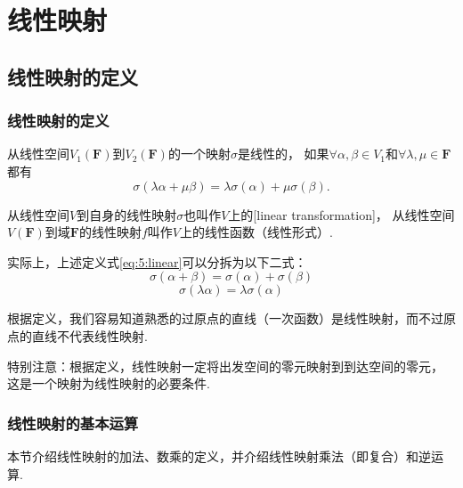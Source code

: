 \chapter{线性映射}

\section{线性映射的定义}
\subsection{线性映射的定义}
\begin{definition}
    从线性空间$V_1(\mathbf{F})$到$V_2(\mathbf{F})$的一个映射$\sigma$是线性的，
    如果$\forall \alpha,\beta \in V_1$和$\forall \lambda,\mu \in \mathbf{F}$都有
    \begin{equation}\label{eq:5:linear}
        \sigma(\lambda\alpha+\mu\beta)=\lambda\sigma(\alpha)+\mu\sigma(\beta).
    \end{equation}

    从线性空间$V$到自身的线性映射$\sigma$也叫作$V$上的[linear transformation]，
    从线性空间$V(\mathbf{F})$到域$\mathbf{F}$的线性映射$f$叫作$V$上的线性函数（线性形式）.
\end{definition}
实际上，上述定义式\eqref{eq:5:linear}可以分拆为以下二式：
\begin{equation} \tag{加性} %
    \sigma(\alpha+\beta)=\sigma(\alpha)+\sigma(\beta)
\end{equation}
\begin{equation} \tag{齐次性}
    \sigma(\lambda\alpha)=\lambda\sigma(\alpha)
\end{equation}

根据定义，我们容易知道熟悉的过原点的直线（一次函数）是线性映射，而不过原点的直线不代表线性映射.

特别注意：根据定义，线性映射一定将出发空间的零元映射到到达空间的零元，
这是一个映射为线性映射的必要条件.
\subsection{线性映射的基本运算}
本节介绍线性映射的加法、数乘的定义，并介绍线性映射乘法（即复合）和逆运算.

